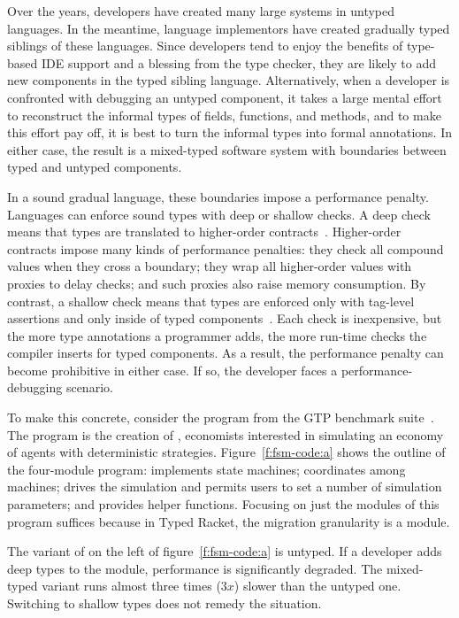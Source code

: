 
Over the years, developers have created many large systems in untyped languages.
In the meantime, language implementors have created gradually typed siblings of
these languages.  Since developers tend to enjoy the benefits of type-based IDE
support and a blessing from the type checker, they are likely to add new
components in the typed sibling language. Alternatively, when a developer is
confronted with debugging an untyped component, it takes a large mental effort
to reconstruct the informal types of fields, functions, and methods, and to make
this effort pay off, it is best to turn the informal types into formal
annotations. In either case, the result is a mixed-typed software system with
boundaries between typed and untyped components.

In a sound gradual language, these boundaries impose a performance penalty.  Languages can
enforce sound types with deep or shallow checks. A deep check means that types are
translated to higher-order contracts~\cite{ff-icfp-2002,tf-dls-2006,st-sfp-2006}.
Higher-order contracts impose many kinds of performance penalties: they check all
compound values when they cross a boundary; they wrap all higher-order values with
proxies to delay checks; and such proxies also raise memory consumption. By
contrast, a shallow check means that types are enforced only with tag-level
assertions and only inside of typed components~\cite{vss-popl-2017,
vksb-dls-2014}. Each check is inexpensive, but the more type annotations a
programmer adds, the more run-time checks the compiler inserts for typed
components. As a result, the performance penalty can become prohibitive in
either case. If so, the developer faces a performance-debugging scenario.

To make this concrete, consider the  program from the GTP benchmark
suite~\cite{gtnffvf-jfp-2019,g-rep-2023}. The program is the creation of \citet{fsm},
economists interested in simulating an economy of agents with deterministic
strategies. Figure~\ref{f:fsm-code:a} shows the outline of the four-module
program:  implements state machines;  coordinates among
machines;  drives the simulation and permits users to set a number of
simulation parameters; and  provides helper functions.  Focusing on
just the modules of this program suffices because in Typed Racket, the migration
granularity is a module.

The variant of  on the left of figure~\ref{f:fsm-code:a} is untyped.
If a developer adds deep types to the  module, performance is
significantly degraded. The mixed-typed variant runs almost three times
($3x$) slower than the untyped one.  Switching to shallow types does not remedy
the situation. 

